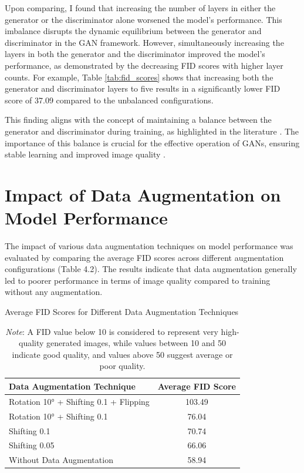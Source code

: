 Upon comparing, I found that increasing the number of layers in either the generator or the discriminator alone worsened the model’s performance. This imbalance disrupts the dynamic equilibrium between the generator and discriminator in the GAN framework. However, simultaneously increasing the layers in both the generator and the discriminator improved the model’s performance, as demonstrated by the decreasing FID scores with higher layer counts. For example, Table \ref{tab:fid_scores} shows that increasing both the generator and discriminator layers to five results in a significantly lower FID score of 37.09 compared to the unbalanced configurations.

This finding aligns with the concept of maintaining a balance between the generator and discriminator during training, as highlighted in the literature \citep{10.48550/arxiv.1703.10717}. The importance of this balance is crucial for the effective operation of GANs, ensuring stable learning and improved image quality \citep{10.48550/arxiv.2002.02112}.    


\section{Impact of Data Augmentation on Model Performance}

The impact of various data augmentation techniques on model performance was evaluated by comparing the average FID scores across different augmentation configurations (Table 4.2). The results indicate that data augmentation generally led to poorer performance in terms of image quality compared to training without any augmentation.

\begin{table}[H]
    \centering
    \caption{Average FID Scores for Different Data Augmentation Techniques}
    \begin{tabular}{|l|c|}
    \hline
    \textbf{Data Augmentation Technique} & \textbf{Average FID Score} \\ \hline
    Rotation 10° + Shifting 0.1 + Flipping & 103.49 \\ \hline
    Rotation 10° + Shifting 0.1 & 76.04 \\ \hline
    Shifting 0.1 & 70.74 \\ \hline
    Shifting 0.05 & 66.06 \\ \hline
    \rowcolor{green!25} Without Data Augmentation & 58.94 \\ \hline
    \end{tabular}
    \label{tab:augmented_training_average}
    \vspace{2mm}
    \caption*{\textit{Note}: A FID value below 10 is considered to represent very high-quality generated images, 
    while values between 10 and 50 indicate good quality, and values above 50 suggest average or poor quality.}
\end{table}

